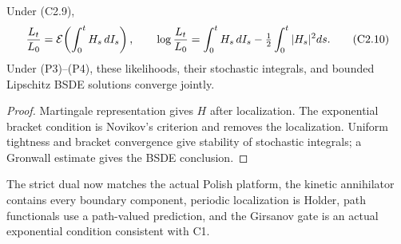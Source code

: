 \begin{proposition}
\label{prop:r27-c2-girsanov}
Under (C2.9),
\[
 {L_t\over L_0}
 =\mathcal E\!\left(\int_0^tH_s\,dI_s\right),\qquad
 \log{L_t\over L_0}
 =\int_0^tH_s\,dI_s-\tfrac12\int_0^t|H_s|^2ds.             \tag{C2.10}
\]
Under (P3)--(P4), these likelihoods, their stochastic integrals, and bounded
Lipschitz BSDE solutions converge jointly.
\end{proposition}

\begin{proof}
Martingale representation gives $H$ after localization.  The exponential
bracket condition is Novikov's criterion and removes the localization.
Uniform tightness and bracket convergence give stability of stochastic
integrals; a Gronwall estimate gives the BSDE conclusion.
\end{proof}

The strict dual now matches the actual Polish platform, the kinetic
annihilator contains every boundary component, periodic localization is
Holder, path functionals use a path-valued prediction, and the Girsanov gate
is an actual exponential condition consistent with C1.
